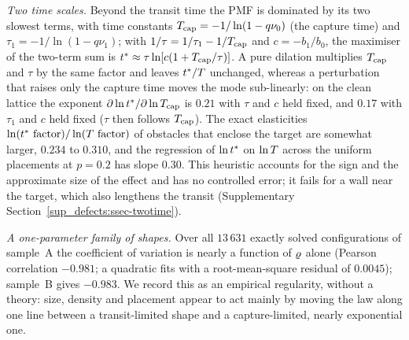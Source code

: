 \emph{Two time scales.} Beyond the transit time the PMF is dominated by its two slowest terms, with time constants
$T_{\mathrm{cap}}=-1/\ln(1-q\nu_0)$ (the capture time) and $\tau_1=-1/\ln(1-q\nu_1)$; with $1/\tau=1/\tau_1-1/T_{\mathrm{cap}}$ and
$c=-b_1/b_0$, the maximiser of the two-term sum is $t^{*}\approx\tau\ln[c(1+T_{\mathrm{cap}}/\tau)]$. A pure dilation multiplies $T_{\mathrm{cap}}$
and $\tau$ by the same factor and leaves $t^{*}/T$ unchanged, whereas a perturbation that raises only the capture time
moves the mode sub-linearly: on the clean lattice the exponent $\partial\ln t^{*}/\partial\ln T_{\mathrm{cap}}$ is $0.21$ with $\tau$
and $c$ held fixed, and $0.17$ with $\tau_1$ and $c$ held fixed ($\tau$ then follows $T_{\mathrm{cap}}$). The exact
elasticities $\ln(\tmode\ \text{factor})/\ln(\MF\ \text{factor})$ of obstacles that enclose the target are somewhat larger,
$0.234$ to $0.310$, and the regression of $\ln t^{*}$ on $\ln T$ across the uniform placements at $p=0.2$ has slope $0.30$. This
heuristic accounts for the sign and the approximate size of the effect and has no controlled error; it fails for a wall
near the target, which also lengthens the transit (Supplementary Section~\ref{sup_defects:ssec-twotime}).

\emph{A one-parameter family of shapes.} Over all $13\,631$ exactly solved configurations of sample~A the coefficient of
variation is nearly a function of $\varrho$ alone (Pearson correlation $-0.981$; a quadratic fits with a root-mean-square
residual of $0.0045$); sample~B gives $-0.983$. We record this as an empirical regularity, without a theory: size, density
and placement appear to act mainly by moving the law along one line between a transit-limited shape and a
capture-limited, nearly exponential one.

